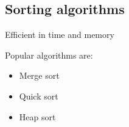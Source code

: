 
\subsection{Sorting algorithms}

Efficient in time and memory

Popular algorithms are:

\begin{itemize}
\item Merge sort
\item Quick sort
\item Heap sort
\end{itemize}

